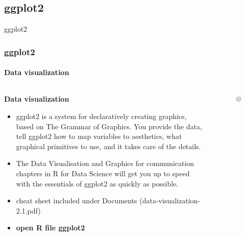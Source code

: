 \documentclass[
	11pt, %
]{beamer}
\begin{document}
\subsection{ggplot2}
\begin{frame}[fragile]{ggplot2}
	\frametitle{ggplot2}
	\framesubtitle{Data visualization} %

	\begin{columns}[c] %
		\begin{column}{0.75\textwidth} %
			\textbf{Data visualization}
			\begin{itemize}
			\small
        \item ggplot2 is a system for declaratively creating graphics, based on The Grammar of Graphics. You provide the data, tell ggplot2 how to map variables to aesthetics, what graphical primitives to use, and it takes care of the details.
        \item The \textcolor{codegreen}{Data Visualisation} and \textcolor{codegreen}{Graphics for communication} chapters in R for Data Science will get you up to speed with the essentials of ggplot2 as quickly as possible.
        \item cheat sheet included under Documents (data-visualization-2.1.pdf)
        \item \textbf{open R file ggplot2}
			\end{itemize}
		\end{column}
		\begin{column}{0.25\textwidth} %
\begin{figure}
   \includegraphics[width= 0.7\linewidth]{../Figures/ggplot2.png}
\end{figure}
		\end{column}
	\end{columns}
	
	\end{frame}
\end{document}
